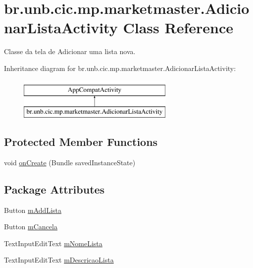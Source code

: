 \hypertarget{classbr_1_1unb_1_1cic_1_1mp_1_1marketmaster_1_1AdicionarListaActivity}{}\section{br.\+unb.\+cic.\+mp.\+marketmaster.\+Adicionar\+Lista\+Activity Class Reference}
\label{classbr_1_1unb_1_1cic_1_1mp_1_1marketmaster_1_1AdicionarListaActivity}


Classe da tela de Adicionar uma lista nova.  


Inheritance diagram for br.\+unb.\+cic.\+mp.\+marketmaster.\+Adicionar\+Lista\+Activity\+:\begin{figure}[H]
\begin{center}
\leavevmode
\includegraphics[height=2.000000cm]{classbr_1_1unb_1_1cic_1_1mp_1_1marketmaster_1_1AdicionarListaActivity}
\end{center}
\end{figure}
\subsection*{Protected Member Functions}
\begin{DoxyCompactItemize}
\item 
void \mbox{\hyperlink{classbr_1_1unb_1_1cic_1_1mp_1_1marketmaster_1_1AdicionarListaActivity_aae0a171062bb9c865e67d5fa336c167d}{on\+Create}} (Bundle saved\+Instance\+State)
\end{DoxyCompactItemize}
\subsection*{Package Attributes}
\begin{DoxyCompactItemize}
\item 
Button \mbox{\hyperlink{classbr_1_1unb_1_1cic_1_1mp_1_1marketmaster_1_1AdicionarListaActivity_a0090613208a9a1007c0863086e141bb7}{m\+Add\+Lista}}
\item 
Button \mbox{\hyperlink{classbr_1_1unb_1_1cic_1_1mp_1_1marketmaster_1_1AdicionarListaActivity_a3df100d463a2951417a8e191ea8c9ff6}{m\+Cancela}}
\item 
Text\+Input\+Edit\+Text \mbox{\hyperlink{classbr_1_1unb_1_1cic_1_1mp_1_1marketmaster_1_1AdicionarListaActivity_a27b2a8ecd00e553575d96aafe5e13e14}{m\+Nome\+Lista}}
\item 
Text\+Input\+Edit\+Text \mbox{\hyperlink{classbr_1_1unb_1_1cic_1_1mp_1_1marketmaster_1_1AdicionarListaActivity_afccbdd495be31756c9f9f776b237da68}{m\+Descricao\+Lista}}
\end{DoxyCompactItemize}
